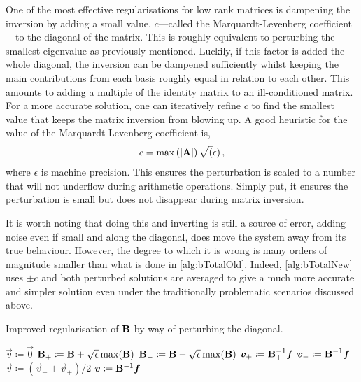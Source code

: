 One of the most effective regularisations for low rank matrices is dampening the inversion by adding a small value, $c$---called the Marquardt-Levenberg coefficient---to the diagonal of the matrix. This is roughly equivalent to perturbing the smallest eigenvalue as previously mentioned. Luckily, if this factor is added the whole diagonal, the inversion can be dampened sufficiently whilst keeping the main contributions from each basis roughly equal in relation to each other. This amounts to adding a multiple of the identity matrix to an ill-conditioned matrix. For a more accurate solution, one can iteratively refine $c$ to find the smallest value that keeps the matrix inversion from blowing up. A good heuristic for the value of the Marquardt-Levenberg coefficient is,
\begin{align}\label{eq:marquardt}
    c = \max\left(\lvert\mathbf{A}\rvert\right) \sqrt(\epsilon)\,,
\end{align}
where $\epsilon$ is machine precision. This ensures the perturbation is scaled to a number that will not underflow during arithmetic operations. Simply put, it ensures the perturbation is small but does not disappear during matrix inversion.

It is worth noting that doing this and inverting is still a source of error, adding noise even if small and along the diagonal, does move the system away from its true behaviour. However, the degree to which it is wrong is many orders of magnitude smaller than what is done in \cref{alg:bTotalOld}. Indeed, \cref{alg:bTotalNew} uses $\pm c $ and both perturbed solutions are averaged to give a much more accurate and simpler solution even under the traditionally problematic scenarios discussed above.
\begin{algorithm}
    \caption{Improved regularisation of $\mathbf{B}$ by way of perturbing the diagonal.}
    \label{alg:bTotalNew}
    \begin{algorithmic}
        \State $\vec{v} \coloneqq \vec{0}$
        \State $\mathbf{B}_+ \coloneqq \mathbf{B} + \sqrt{\epsilon} \max(\mathbf{B})$
        \State $\mathbf{B}_- \coloneqq \mathbf{B} - \sqrt{\epsilon} \max(\mathbf{B})$
        \State $\vec{v}_+ \coloneqq \mtx{B}_+^{-1} \vec{f}$
        \State $\vec{v}_- \coloneqq \mtx{B}_-^{-1} \vec{f}$
        \State $\vec{v} \coloneqq (\vec{v}_- + \vec{v}_+)/2$
        \Else
        \State $\vec{v} \coloneqq \mtx{B}^{-1} \vec{f}$
        \EndIf
    \end{algorithmic}
\end{algorithm}

